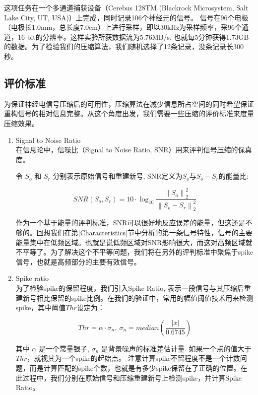 这项任务在一个多通道捕获设备（Cerebus 128TM (Blackrock Microsystem, Salt Lake City, UT, USA)）上完成，同时记录106个神经元的信号。 信号在96个电极（电极长1.0mm，总长度7.0cm）上进行采样，即以30kHz为采样频率，采96个通道，16-bit的分辨率。这样实验所获数据流为5.76MB/s, 也就每5分钟获得1.73GB的数据。为了检验我们的压缩算法，我们随机选择了12条记录，没条记录长300秒。




\subsection{评价标准}
为保证神经电信号压缩后的可用性，压缩算法在减少信息所占空间的同时希望保证重构信号的相对信息完整\cite{24}。从这个角度出发，我们需要一些压缩的评价标准来度量压缩效果。

\begin{enumerate}
\item{Signal to Noise Ratio}\\
在信息论中，信噪比（Signal to Noise Ratio, SNR）用来评判信号压缩的保真度。

令 $S_o$ 和 $S_r$ 分别表示原始信号和重建新号, SNR定义为$S_o$与$S_o-S_r$的能量比:


\begin{equation}\label{Eq:SNR Def}
  SNR(S_o,S_r)=10\cdot \log_{10} \frac{\left\|S_o\right\|_2^2}{\left\|S_o-S_r\right\|_2^2}
\end{equation}

作为一个基于能量的评判标准，SNR可以很好地反应误差的能量，但这还是不够的。回想我们在第\ref{Characteristics}节中分析的第一条信号特性，信号的主要能量集中在低频区域。也就是说低频区域对SNR影响很大，而这对高频区域就不平等了。为了解决这个不平等问题，我们将在另外的评判标准中聚焦于spike信号，也就是高频部分的主要有效信号。

\item{Spike ratio}\\
为了检验spike的保留程度，我们引入Spike Ratio, 表示一段信号与其压缩后重建新号相比保留的spike比例。在我们的验证中，常用的幅值阈值技术\cite{34}用来检测spike，其中阈值$Thr$设定为：


\begin{equation}\label{Eq: Spike Detection Threshold}
  Thr=\alpha \cdot \sigma_n,\ \sigma_n=median\left(\frac{|x|}{0.6745}\right)
\end{equation}

其中 $\alpha$ 是一个常量银子, $\sigma_n$ 是背景噪声的标准差估计量. 如果一个点的值大于 $Thr$，就视其为一个spike的起始点。 注意计算spike不留程度不是一个计数问题，而是计算匹配的spike个数，也就是有多少spike保留在了正确的位置。在此过程中，我们分别在原始信号和压缩重建新号上检测spike，并计算Spike Ratio。


\end{enumerate}
